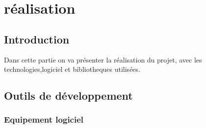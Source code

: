 \documentclass{article}
\begin{document}
    \section{réalisation}
        \subsection{Introduction}
            Dans cette partie on va présenter la réalisation du projet, avec les technologies,logiciel et bibliotheques utilisées.
        
        \subsection{Outils de développement}
            
            \subsubsection{Equipement logiciel}
\end{document}
